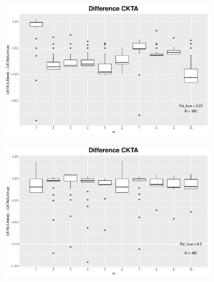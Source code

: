 \documentclass[11pt, a4paper]{article} %
\begin{document}
\begin{landscape}
\begin{figure}
\begin{subfigure}{\textwidth}
  \centering
  \includegraphics[width=.8\linewidth]{dif_ckta_psi_025.pdf}
  \label{fig:sfig1}
\end{subfigure}%
\begin{subfigure}{\textwidth}
  \centering
  \includegraphics[width=.8\linewidth]{dif_ckta_psi_050.pdf}
  \label{fig:sfig2}
\end{subfigure}\\


\end{figure}
\end{landscape}
\end{document}
